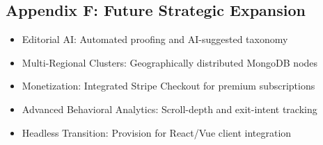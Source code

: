\documentclass[12pt,a4paper]{report}
\begin{document}
\subsection{Appendix F: Future Strategic Expansion}
\begin{itemize}
    \item Editorial AI: Automated proofing and AI-suggested taxonomy
    \item Multi-Regional Clusters: Geographically distributed MongoDB nodes
    \item Monetization: Integrated Stripe Checkout for premium subscriptions
    \item Advanced Behavioral Analytics: Scroll-depth and exit-intent tracking
    \item Headless Transition: Provision for React/Vue client integration
\end{itemize}
\end{document}
